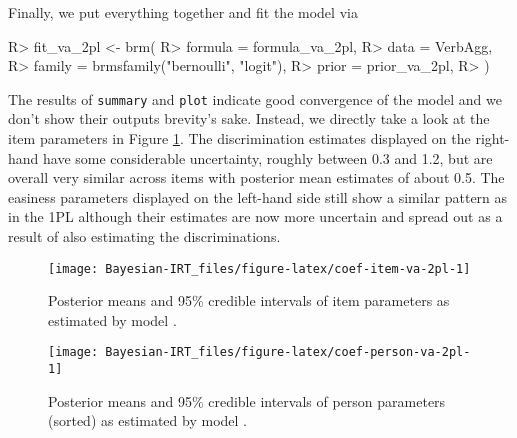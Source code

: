 \documentclass[jss]{jss}
\begin{document}
Finally, we put everything together and fit the model via

\begin{CodeChunk}

\begin{CodeInput}
R> fit_va_2pl <- brm(
R>   formula = formula_va_2pl,
R>   data = VerbAgg, 
R>   family = brmsfamily("bernoulli", "logit"),
R>   prior = prior_va_2pl,
R> )
\end{CodeInput}
\end{CodeChunk}

The results of \texttt{summary} and \texttt{plot} indicate good
convergence of the model and we don't show their outputs brevity's sake.
Instead, we directly take a look at the item parameters in Figure
\ref{fig:coef-item-va-2pl}. The discrimination estimates displayed on
the right-hand have some considerable uncertainty, roughly between 0.3
and 1.2, but are overall very similar across items with posterior mean
estimates of about 0.5. The easiness parameters displayed on the
left-hand side still show a similar pattern as in the 1PL although their
estimates are now more uncertain and spread out as a result of also
estimating the discriminations.

\begin{CodeChunk}
\begin{figure}

{\centering \texttt{[image: Bayesian-IRT\_files/figure-latex/coef-item-va-2pl-1]} 

}

\caption[Posterior means and 95\% credible intervals of item parameters as estimated by model ]{Posterior means and 95\% credible intervals of item parameters as estimated by model .}\label{fig:coef-item-va-2pl}
\end{figure}
\end{CodeChunk}

\begin{CodeChunk}
\begin{figure}

{\centering \texttt{[image: Bayesian-IRT\_files/figure-latex/coef-person-va-2pl-1]} 

}

\caption[Posterior means and 95\% credible intervals of person parameters (sorted) as estimated by model ]{Posterior means and 95\% credible intervals of person parameters (sorted) as estimated by model .}\label{fig:coef-person-va-2pl}
\end{figure}
\end{CodeChunk}
\end{document}
